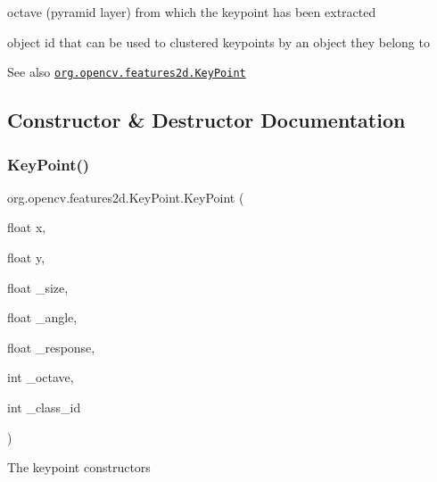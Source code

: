 {\ttfamily }

{\ttfamily }

{\ttfamily octave (pyramid layer) from which the keypoint has been extracted}

{\ttfamily }

{\ttfamily }

{\ttfamily object id that can be used to clustered keypoints by an object they belong to}

{\ttfamily }

{\ttfamily \begin{DoxySeeAlso}{See also}
\href{http://docs.opencv.org/modules/features2d/doc/common_interfaces_of_feature_detectors.html#keypoint}{\tt org.\+opencv.\+features2d.\+Key\+Point} 
\end{DoxySeeAlso}
}

\subsection{Constructor \& Destructor Documentation}
\mbox{\label{classorg_1_1opencv_1_1features2d_1_1_key_point_ab881124337e7ed8f8901941a93480b3e}} 
\subsubsection{\texorpdfstring{Key\+Point()}{KeyPoint()}\hspace{0.1cm}{\footnotesize\ttfamily [1/6]}}
{\footnotesize\ttfamily org.\+opencv.\+features2d.\+Key\+Point.\+Key\+Point (\begin{DoxyParamCaption}\item[{float}]{x,  }\item[{float}]{y,  }\item[{float}]{\+\_\+size,  }\item[{float}]{\+\_\+angle,  }\item[{float}]{\+\_\+response,  }\item[{int}]{\+\_\+octave,  }\item[{int}]{\+\_\+class\+\_\+id }\end{DoxyParamCaption})}

The keypoint constructors



